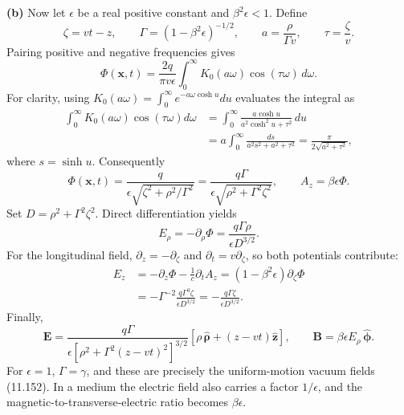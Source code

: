 \textbf{(b)} Now let $\epsilon$ be a real positive constant and
$\beta^2\epsilon<1$. Define
\[
 \zeta=vt-z,\qquad
 \Gamma=(1-\beta^2\epsilon)^{-1/2},\qquad
 a=\frac{\rho}{\Gamma v},\qquad \tau=\frac{\zeta}{v}.
\]
Pairing positive and negative frequencies gives
\[
 \Phi(\mathbf x,t)=\frac{2q}{\pi v\epsilon}
       \int_0^\infty K_0(a\omega)\cos(\tau\omega)\,d\omega.
\]
For clarity, using $K_0(a\omega)=
\int_0^\infty e^{-a\omega\cosh u}du$ evaluates the integral as
\[
 \begin{split}
 \int_0^\infty K_0(a\omega)\cos(\tau\omega)d\omega
 &=\int_0^\infty
    \frac{a\cosh u}{a^2\cosh^2u+\tau^2}\,du\\
 &=a\int_0^\infty\frac{ds}{a^2s^2+a^2+\tau^2}
 =\frac{\pi}{2\sqrt{a^2+\tau^2}},
 \end{split}
\]
where $s=\sinh u$. Consequently
\[
 \boxed{\Phi(\mathbf x,t)
 =\frac{q}{\epsilon\sqrt{\zeta^2+\rho^2/\Gamma^2}}
 =\frac{q\Gamma}{\epsilon\sqrt{\rho^2+\Gamma^2\zeta^2}},
 \qquad A_z=\beta\epsilon\Phi.}
\]
Set $D=\rho^2+\Gamma^2\zeta^2$. Direct differentiation yields
\[
 E_\rho=-\partial_\rho\Phi
      =\frac{q\Gamma\rho}{\epsilon D^{3/2}}.
\]
For the longitudinal field, $\partial_z=-\partial_\zeta$ and
$\partial_t=v\partial_\zeta$, so both potentials contribute:
\[
 \begin{split}
 E_z&=-\partial_z\Phi-\frac1c\partial_tA_z
 =(1-\beta^2\epsilon)\partial_\zeta\Phi\\
 &=-\Gamma^{-2}\frac{q\Gamma^3\zeta}{\epsilon D^{3/2}}
 =-\frac{q\Gamma\zeta}{\epsilon D^{3/2}}.
 \end{split}
\]
Finally,
\[
 \boxed{\mathbf E=\frac{q\Gamma}
 {\epsilon[\rho^2+\Gamma^2(z-vt)^2]^{3/2}}
       [\rho\,\hat{\boldsymbol\rho}+(z-vt)\hat{\mathbf z}],
 \qquad
 \mathbf B=\beta\epsilon E_\rho\,\hat{\boldsymbol\phi}.}
\]
For $\epsilon=1$, $\Gamma=\gamma$, and these are precisely the
uniform-motion vacuum fields (11.152). In a medium the electric field
also carries a factor $1/\epsilon$, and the magnetic-to-transverse-electric
ratio becomes $\beta\epsilon$.


